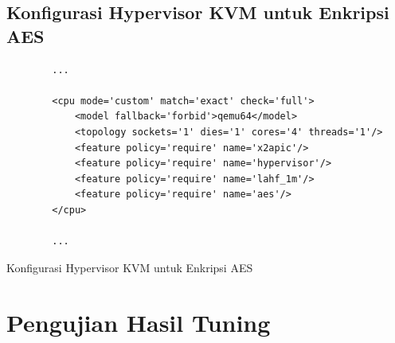 \subsection{Konfigurasi Hypervisor KVM untuk Enkripsi AES}
\begin{listing}[H]
    \begin{verbatim}
        ...

        <cpu mode='custom' match='exact' check='full'>
            <model fallback='forbid'>qemu64</model>
            <topology sockets='1' dies='1' cores='4' threads='1'/>
            <feature policy='require' name='x2apic'/>
            <feature policy='require' name='hypervisor'/> 
            <feature policy='require' name='lahf_1m'/>
            <feature policy='require' name='aes'/>
        </cpu>
        
        ...
    \end{verbatim}
    \caption{Konfigurasi Hypervisor KVM untuk Enkripsi AES}
    \label{code:tuned_enkripsi_aes}
\end{listing}

\section{Pengujian Hasil Tuning}

